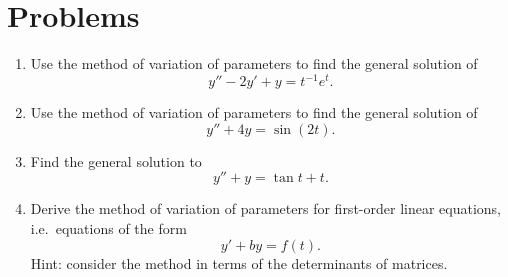 \documentclass[10pt,driverfallback=hypertex]{report}
\begin{document}
\section{Problems}

\begin{enumerate}

\item Use the method of variation of parameters to find the general solution of
  \begin{dmath*}
  y'' - 2 y' + y = t^{-1} e^t.
  \end{dmath*}

\item Use the method of variation of parameters to find the general solution of
  \begin{dmath*}
  y'' + 4y = \sin(2t).
  \end{dmath*}

\item
  Find the general solution to
  \begin{dmath*}
  y'' + y = \tan t + t.
  \end{dmath*}

\item
  Derive the method of variation of parameters for first-order linear
  equations, i.e.\ equations of the form
  \begin{dmath*}
  y' + by = f(t).
  \end{dmath*}
  Hint: consider the method in terms of the determinants of matrices.

\end{enumerate}
\end{document}
